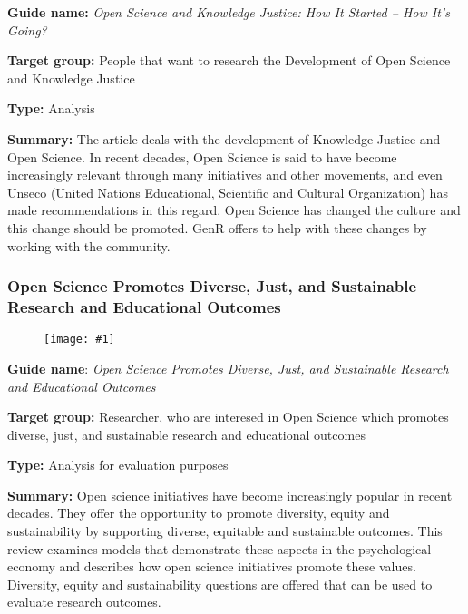 \documentclass{article}
\newlength{\imgwidth}
\newcommand\scaledgraphics[2]{%
                
\settowidth{\imgwidth}{\texttt{[image: \#1]}}%
                
\setlength{\imgwidth}{\minof{\imgwidth}{#2\textwidth}}%
                
\texttt{[image: \#1]}%
                
}
\begin{document}
\textbf{Guide name:} \emph{Open Science and Knowledge Justice: How It Started – How It’s Going?} \autocite{noauthor_open_2021}


\textbf{Target group: }People that want to research the Development of Open Science and Knowledge Justice


\textbf{Type:} Analysis


\textbf{Summary:} The article deals with the development of Knowledge Justice and Open Science. In recent decades, Open Science is said to have become increasingly relevant through many initiatives and other movements, and even Unseco (United Nations Educational, Scientific and Cultural Organization) has made recommendations in this regard. Open Science has changed the culture and this change should be promoted. GenR offers to help with these changes by working with the community.


\subsubsection{Open Science Promotes Diverse, Just, and Sustainable Research and Educational Outcomes}\label{H4807510}



\begin{center}
\begin{figure}
\scaledgraphics{23f9ee73-dda2-4a56-8083-4a618f9983b9.png}{0.75}
\label{F46402811}
\end{figure}


\end{center}


\textbf{Guide name}: \emph{Open Science Promotes Diverse, Just, and Sustainable Research and Educational Outcomes} \autocite{grahe_open_2019}


\textbf{Target group: }Researcher, who are interesed in Open Science which promotes diverse, just, and sustainable research and educational outcomes


\textbf{Type: }Analysis for evaluation purposes


\textbf{Summary:} Open science initiatives have become increasingly popular in recent decades. They offer the opportunity to promote diversity, equity and sustainability by supporting diverse, equitable and sustainable outcomes. This review examines models that demonstrate these aspects in the psychological economy and describes how open science initiatives promote these values. Diversity, equity and sustainability questions are offered that can be used to evaluate research outcomes.


\printbibliography[title={Bibliography}]
\end{document}

